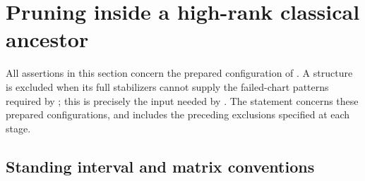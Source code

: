 \section{Pruning inside a high-rank classical ancestor}\label{sec:classical}

All assertions in this section concern the prepared configuration of . A structure is excluded when its full stabilizers cannot supply the failed-chart patterns required by ; this is precisely the input needed by . The statement concerns these prepared configurations, and includes the preceding exclusions specified at each stage.

\subsection{Standing interval and matrix conventions}


